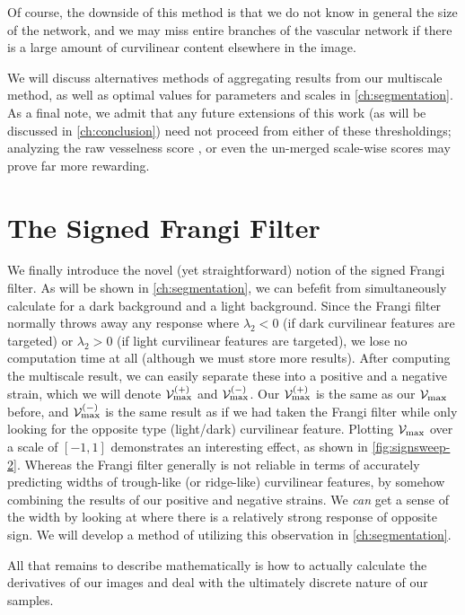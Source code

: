 Of course, the downside of this method is that we do not know in general the size of the network, and  we may miss entire branches of the vascular network if there is a large amount of curvilinear content elsewhere in the image.

We will discuss alternatives methods of aggregating results from our multiscale method, as well as optimal values for parameters and scales
in \cref{ch:segmentation}. As a final note, we admit that any future extensions of this work (as will be discussed in \cref{ch:conclusion}) need not proceed from either of these thresholdings; analyzing the raw vesselness score \Vmax, or even the un-merged scale-wise scores may prove far more rewarding.

\section{The Signed Frangi Filter} \label{sec:signed-frangi-filter}
We finally introduce the novel (yet straightforward) notion of the signed Frangi filter. As will be shown in \cref{ch:segmentation}, we can befefit from simultaneously calculate for a dark background and a light background. Since the Frangi filter normally throws away any response where $\lambda_2 < 0$ (if dark curvilinear features are targeted) or $\lambda_2 >0$ (if light curvilinear features are targeted), we lose no computation time at all (although we must store more results). After computing the multiscale result, we can easily separate these into a positive and a negative strain, which we will denote
$\mathcal{V}_{\max}^{(+)}$ and $\mathcal{V}_{\max}^{(-)}$. Our $\mathcal{V}_{\max}^{(+)}$ is the same as our $\mathcal{V}_{\max}$ before, and $\mathcal{V}_{\max}^{(-)}$ is the same result as if we had taken the Frangi filter while only looking for the opposite type (light/dark) curvilinear feature. Plotting $\mathcal{V}_{\max}$ over a scale of $[-1,1]$ demonstrates an interesting effect, as shown in \cref{fig:signsweep-2}. Whereas the Frangi filter generally is not reliable in terms of accurately predicting widths of trough-like (or ridge-like) curvilinear features, by somehow combining the results of our positive and negative strains. We \textit{can} get a sense of the width by looking at where there is a relatively strong response of opposite sign. We will develop a method of utilizing this observation in \cref{ch:segmentation}.


All that remains to describe mathematically is how to actually calculate the derivatives of our images and deal with the ultimately discrete nature of our samples.    